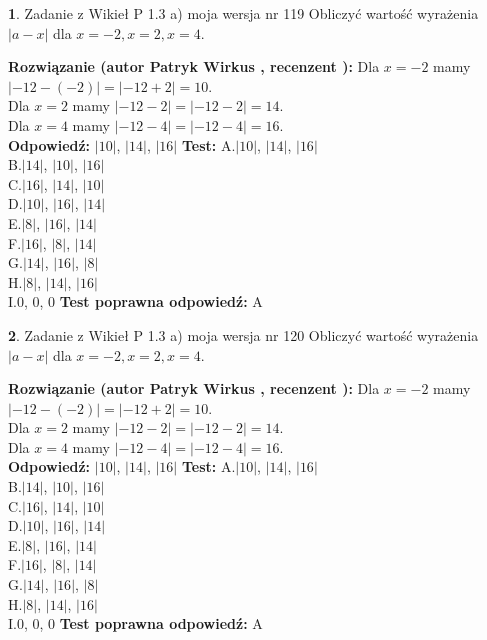 \documentclass[12pt, a4paper]{article}
\theoremstyle{definition} %
\newtheorem{zad}{}
\newcommand{\zadStart}[1]{\begin{zad}#1\newline}
\newcommand{\zadStop}{\end{zad}}
\newcommand{\rozwStart}[2]{\noindent \textbf{Rozwiązanie (autor #1 , recenzent #2): }\newline}
\newcommand{\rozwStop}{\newline}
\newcommand{\odpStart}{\noindent \textbf{Odpowiedź:}\newline}
\newcommand{\odpStop}{\newline}
\newcommand{\testStart}{\noindent \textbf{Test:}\newline}
\newcommand{\testStop}{\newline}
\newcommand{\kluczStart}{\noindent \textbf{Test poprawna odpowiedź:}\newline}
\newcommand{\kluczStop}{\newline}
\begin{document}
\zadStart{Zadanie z Wikieł P 1.3 a) moja wersja nr 119}
Obliczyć wartość wyrażenia $|a - x|$ dla $x=-2,x=2,x=4$.
\zadStop
\rozwStart{Patryk Wirkus}{}
Dla $x = -2$ mamy $|-12 - (-2)| = |-12 + 2| = 10$.\\
Dla $x = 2$ mamy $|-12 - 2| = |-12 - 2| = 14$.\\
Dla $x = 4$ mamy $|-12 - 4| = |-12 - 4| = 16$.\\
\rozwStop
\odpStart
$|10|$, $|14|$, $|16|$
\odpStop
\testStart
A.$|10|$, $|14|$, $|16|$\\
B.$|14|$, $|10|$, $|16|$\\
C.$|16|$, $|14|$, $|10|$\\
D.$|10|$, $|16|$, $|14|$\\
E.$|8|$, $|16|$, $|14|$\\
F.$|16|$, $|8|$, $|14|$\\
G.$|14|$, $|16|$, $|8|$\\
H.$|8|$, $|14|$, $|16|$\\
I.$0$, $0$, $0$
\testStop
\kluczStart
A
\kluczStop



\zadStart{Zadanie z Wikieł P 1.3 a) moja wersja nr 120}
Obliczyć wartość wyrażenia $|a - x|$ dla $x=-2,x=2,x=4$.
\zadStop
\rozwStart{Patryk Wirkus}{}
Dla $x = -2$ mamy $|-12 - (-2)| = |-12 + 2| = 10$.\\
Dla $x = 2$ mamy $|-12 - 2| = |-12 - 2| = 14$.\\
Dla $x = 4$ mamy $|-12 - 4| = |-12 - 4| = 16$.\\
\rozwStop
\odpStart
$|10|$, $|14|$, $|16|$
\odpStop
\testStart
A.$|10|$, $|14|$, $|16|$\\
B.$|14|$, $|10|$, $|16|$\\
C.$|16|$, $|14|$, $|10|$\\
D.$|10|$, $|16|$, $|14|$\\
E.$|8|$, $|16|$, $|14|$\\
F.$|16|$, $|8|$, $|14|$\\
G.$|14|$, $|16|$, $|8|$\\
H.$|8|$, $|14|$, $|16|$\\
I.$0$, $0$, $0$
\testStop
\kluczStart
A
\kluczStop
\end{document}
